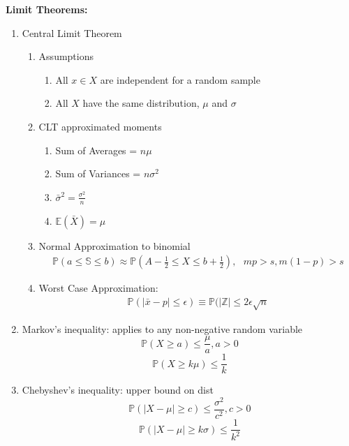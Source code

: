 \documentclass[12pt]{article}
\newcommand{\abs}[1]{\left| #1 \right|} %
\renewcommand{\=}[1]{\stackrel{#1}{=}} %
\theoremstyle{definition}
\theoremstyle{remark}
\begin{document}
  \textbf{Limit Theorems:}
  \begin{enumerate}
  \item Central Limit Theorem
    \begin{enumerate}
    \item Assumptions
      \begin{enumerate}
      \item All $x \in X$ are independent for a random sample
      \item All $X$ have the same distribution, $\mu$ and $\sigma$
      \end{enumerate}
    \item CLT approximated moments
      \begin{enumerate}
      \item Sum of Averages = $n\mu$
      \item Sum of Variances = $n\sigma^2$
      \item $\bar{\sigma}^2 = \frac{\sigma^2}{n}$
      \item $\mathbb{E}(\bar{X}) = \mu$
      \end{enumerate}

    \item Normal Approximation to binomial
      \begin{align*}
        \mathbb{P}(a \leq \mathbb{S} \leq b) \approx
        \mathbb{P}(A-\frac{1}{2} \leq X \leq b + \frac{1}{2}),\textrm{ } mp > s, m(1-p)>s
      \end{align*}
    \item Worst Case Approximation:
      \begin{align*}
        \mathbb{P}(\abs{\bar{x}-p} \leq \epsilon) \equiv
        \mathbb{P}(\abs{\mathbb{Z}} \leq 2\epsilon\sqrt{n}
      \end{align*}
    \end{enumerate}
  \item Markov's inequality: applies to any non-negative random variable
    \begin{equation}
      \mathbb{P}(X \geq a) \leq \frac{\mu}{a} , a >0
    \end{equation}
    \begin{equation}
      \mathbb{P}(X \geq k\mu) \leq \frac{1}{k}
    \end{equation}
  \item Chebyshev's inequality: upper bound on dist
    \begin{equation}
      \mathbb{P}(\abs{X-\mu} \geq c) \leq \frac{\sigma^2}{c^2}, c>0
    \end{equation}
    \begin{equation}
      \mathbb{P}(\abs{X-\mu} \geq k\sigma) \leq \frac{1}{k^2}
    \end{equation}
  \end{enumerate}
\end{document}
